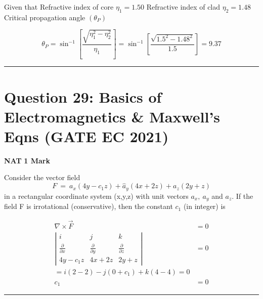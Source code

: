 \documentclass[11pt,a4paper]{article}
\begin{document}
\begin{tcolorbox}[solbox, title=Detailed Solution -- Question 28]
Given that
 Refractive index of core $\eta_{1}=1.50$
 Refractive index of clad $\eta_{2}=1.48$
 Critical propagation angle $\left(\theta_{P}\right)$

\[
\theta_{P}=\sin ^{-1}\left[ \frac{ \sqrt{\eta_{1}^{2}-\eta_{2}^{2}}}{\eta_{1}}    \right]=\sin ^{-1} \left[  \frac{  \sqrt{1.5^{2}-1.48^{2}} }{1.5} \right] =9.37
\]
\end{tcolorbox}

\vspace{1.5em}
\hrule
\vspace{1.5em}

\section*{Question 29: Basics of Electromagnetics \& Maxwell's Eqns (GATE EC 2021)}
\noindent \textbf{\color{primary}NAT} \hfill \textbf{\color{secondary}1 Mark}


\noindent Consider the vector field 
\[
F\:=\:a_{x}\left ( 4y-c_{1}z \right )+\hat{a}_y\left ( 4x + 2z\right )+a_{z}\left ( 2y +z\right )
\]
 in a rectangular coordinate system (x,y,z) with unit vectors $a_{x},\:a_{y}$ and $a_{z}$. If the field F is irrotational (conservative), then the constant $c_{1}$
(in integer) is \underline{\hspace{1.5cm}}


\begin{tcolorbox}[solbox, title=Detailed Solution -- Question 29]
\[
\begin{aligned} \nabla \times \vec{F}&=0\\ \left|\begin{array}{ccc} i & j & k \\ \frac{\partial}{\partial x} & \frac{\partial}{\partial y} & \frac{\partial}{\partial z} \\ 4 y-c_{1} z & 4 x+2 z & 2 y+z \end{array}\right|&=0\\ =i(2-2)-j\left(0+c_{1}\right)+k(4-4)=0 \\ c_{1} &=0 \end{aligned}
\]
\end{tcolorbox}

\vspace{1.5em}
\hrule
\vspace{1.5em}
\end{document}
